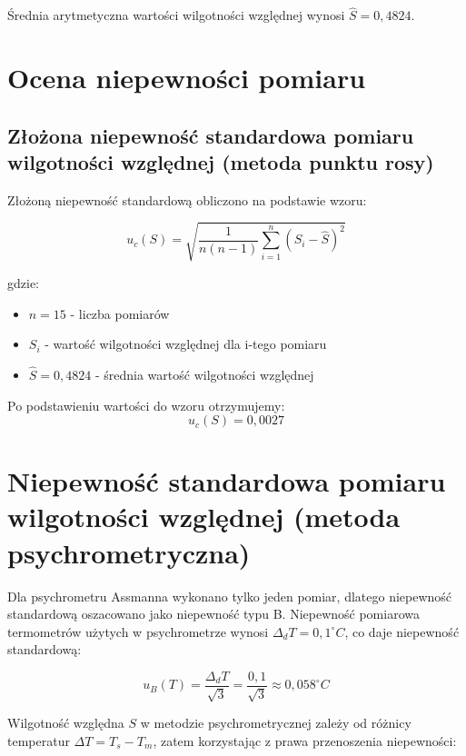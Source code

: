 \documentclass[a4paper,12pt]{article}
\begin{document}
Średnia arytmetyczna wartości wilgotności względnej wynosi $\hat{S} = 0{,}4824$.

\section{Ocena niepewności pomiaru}

\subsection{Złożona niepewność standardowa pomiaru wilgotności względnej (metoda punktu rosy)}

Złożoną niepewność standardową obliczono na podstawie wzoru:

\begin{equation}
    u_c(S) = \sqrt{\frac{1}{n(n-1)} \sum_{i=1}^{n} (S_i - \hat{S})^2}
\end{equation}

gdzie:
\begin{itemize}
    \item $n = 15$ - liczba pomiarów
    \item $S_i$ - wartość wilgotności względnej dla i-tego pomiaru
    \item $\hat{S} = 0{,}4824$ - średnia wartość wilgotności względnej
\end{itemize}

Po podstawieniu wartości do wzoru otrzymujemy:
\begin{equation}
    u_c(S) = 0{,}0027
\end{equation}

\section{Niepewność standardowa pomiaru wilgotności względnej (metoda psychrometryczna)}

Dla psychrometru Assmanna wykonano tylko jeden pomiar, dlatego niepewność standardową oszacowano jako niepewność typu B. Niepewność pomiarowa termometrów użytych w psychrometrze wynosi $\Delta_d T = 0{,}1^\circ C$, co daje niepewność standardową:

\begin{equation}
    u_B(T) = \frac{\Delta_d T}{\sqrt{3}} = \frac{0{,}1}{\sqrt{3}} \approx 0{,}058^\circ C
\end{equation}

Wilgotność względna $S$ w metodzie psychrometrycznej zależy od różnicy temperatur $\Delta T = T_s - T_m$, zatem korzystając z prawa przenoszenia niepewności:
\end{document}
